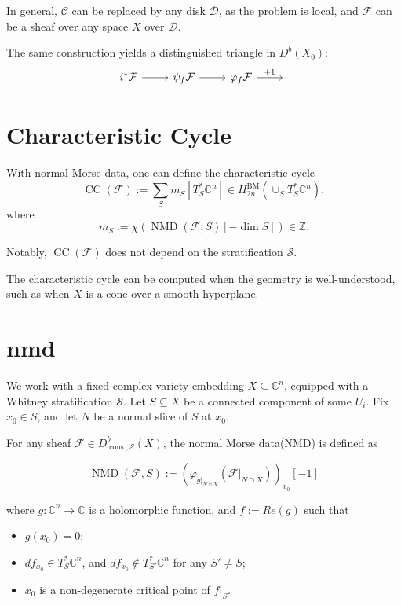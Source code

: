 \documentclass[UTF8]{amsart}
\numberwithin{equation}{section}
\theoremstyle{plain}
\numberwithin{equation}{section}
\theoremstyle{remark}
\DeclareMathOperator{\BM}{\operatorname{BM}}
\DeclareMathOperator{\constructable}{\operatorname{cons}}
\DeclareMathOperator{\CC}{\operatorname{CC}}
\DeclareMathOperator{\NMD}{\operatorname{NMD}}
\begin{document}
In general, $\mathcal{C}$ can be replaced by any disk $\mathcal{D}$, as the problem is local, and $\mathcal{F}$ can be a sheaf over any space $X$ over $\mathcal{D}$. 

The same construction yields a distinguished triangle in $D^b(X_0)$:
\[\begin{tikzcd}[ampersand replacement=\&]
	{i^* \mathcal{F}} \& {\psi_f \mathcal{F}} \& {\varphi_f \mathcal{F}} \& {}
	\arrow[from=1-1, to=1-2]
	\arrow[from=1-2, to=1-3]
	\arrow["{+1}", from=1-3, to=1-4]
\end{tikzcd}\]

\section{Characteristic Cycle}
With normal Morse data, one can define the characteristic cycle
$$\CC(\mathcal{F}):= \sum_S m_S [T_S^* \mathbb{C}^n] \in H_{2n}^{\BM}(\cup_S T_S^* \mathbb{C}^n),$$
where
$$m_S:= \chi(\NMD(\mathcal{F},S)[-\dim S]) \in \mathbb{Z}.$$

Notably, $\CC(\mathcal{F})$ does not depend on the stratification $\mathcal{S}$.

The characteristic cycle can be computed when the geometry is well-understood, such as when $X$ is a cone over a smooth hyperplane.

\section{nmd}

We work with a fixed complex variety embedding $X \subseteq \mathbb{C}^n$, equipped with a Whitney stratification $\mathcal{S}$. Let $S \subseteq X$ be a connected component of some $U_i$. Fix $x_0 \in S$, and let $N$ be a normal slice of $S$ at $x_0$.

For any sheaf $\mathcal{F} \in D^b_{\constructable, \mathcal{S}}(X)$, the normal Morse data(NMD) is defined as

$$\NMD(\mathcal{F}, S):= \left( \varphi_{g|_{N \cap X}} \left(\mathcal{F}|_{N \cap X}\right)  \right)_{x_0} [-1]$$

where $g: \mathbb{C}^n \longrightarrow \mathbb{C}$ is a holomorphic function, and $f:= Re(g)$ such that 
\begin{itemize}
\item $g(x_0)=0$;
\item $df_{x_0} \in T^*_S \mathbb{C}^n$, and $df_{x_0} \notin T^*_{S'} \mathbb{C}^n$ for any $S'\neq S$;
\item $x_0$ is a non-degenerate critical point of $f|_{S}$.
\end{itemize}







\end{document}
